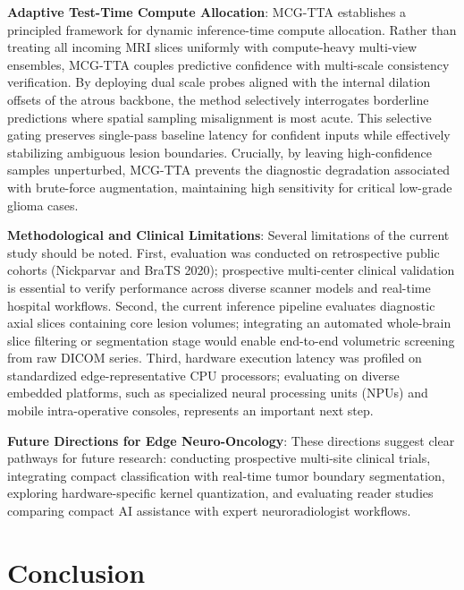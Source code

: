 \documentclass[journal]{IEEEtran}
\begin{document}
\noindent\textbf{Adaptive Test-Time Compute Allocation}: MCG-TTA establishes a principled framework for dynamic inference-time compute allocation. Rather than treating all incoming MRI slices uniformly with compute-heavy multi-view ensembles, MCG-TTA couples predictive confidence with multi-scale consistency verification. By deploying dual scale probes aligned with the internal dilation offsets of the atrous backbone, the method selectively interrogates borderline predictions where spatial sampling misalignment is most acute. This selective gating preserves single-pass baseline latency for confident inputs while effectively stabilizing ambiguous lesion boundaries. Crucially, by leaving high-confidence samples unperturbed, MCG-TTA prevents the diagnostic degradation associated with brute-force augmentation, maintaining high sensitivity for critical low-grade glioma cases.

\noindent\textbf{Methodological and Clinical Limitations}: Several limitations of the current study should be noted. First, evaluation was conducted on retrospective public cohorts (Nickparvar and BraTS 2020); prospective multi-center clinical validation is essential to verify performance across diverse scanner models and real-time hospital workflows. Second, the current inference pipeline evaluates diagnostic axial slices containing core lesion volumes; integrating an automated whole-brain slice filtering or segmentation stage would enable end-to-end volumetric screening from raw DICOM series. Third, hardware execution latency was profiled on standardized edge-representative CPU processors; evaluating on diverse embedded platforms, such as specialized neural processing units (NPUs) and mobile intra-operative consoles, represents an important next step.

\noindent\textbf{Future Directions for Edge Neuro-Oncology}: These directions suggest clear pathways for future research: conducting prospective multi-site clinical trials, integrating compact classification with real-time tumor boundary segmentation, exploring hardware-specific kernel quantization, and evaluating reader studies comparing compact AI assistance with expert neuroradiologist workflows.




\section{Conclusion}
\end{document}
